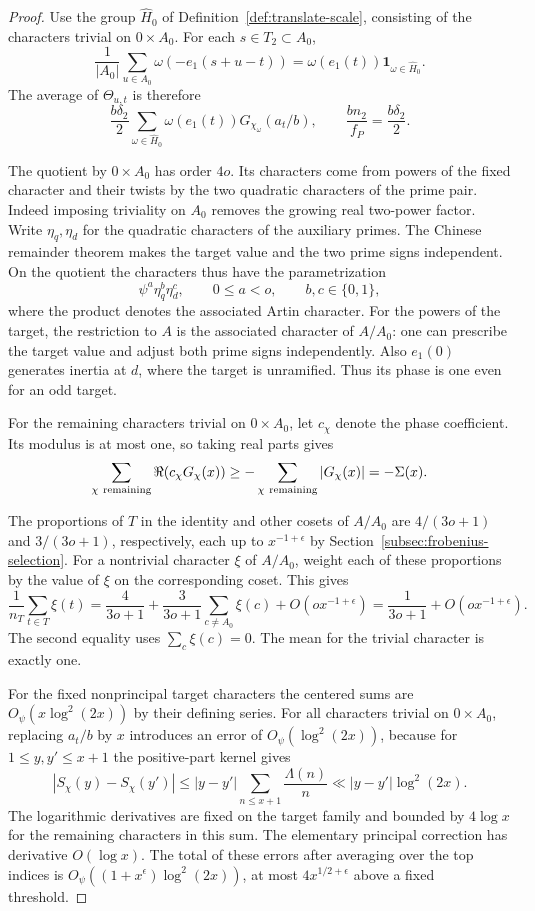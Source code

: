 \begin{proof}
Use the group \(\widehat H_0\) of Definition~\ref{def:translate-scale}, consisting of the characters trivial on
\(0\times A_0\). For each \(s\in T_2\subset A_0\),
\[
 \frac1{|A_0|}\sum_{u\in A_0}\omega(-e_1(s+u-t))
   =\omega(e_1(t))\mathbf 1_{\omega\in\widehat H_0}.
\]
The average of \(\Theta_{u,t}\) is therefore
\[
 \frac{b\delta_2}{2}
 \sum_{\omega\in\widehat H_0}
      \omega(e_1(t))G_{\chi_\omega}(a_t/b),
 \qquad \frac{bn_2}{f_P}=\frac{b\delta_2}{2}.
\] 

The quotient by \(0\times A_0\) has order
\(4o\). Its characters come from powers of the fixed character
and their twists by the two quadratic characters of the prime
pair. Indeed imposing triviality on \(A_0\) removes the growing
real two-power factor. Write \(\eta_q,\eta_d\) for the quadratic characters of the auxiliary primes. The Chinese remainder theorem makes the target value and the two prime signs independent. On the quotient the characters thus have the parametrization
\[
 \psi^a\eta_q^b\eta_d^c,
 \qquad 0\le a<o,\qquad b,c\in\{0,1\},
\]
where the product denotes the associated Artin character. For the powers of the target,
the restriction to \(A\) is the associated character of \(A/A_0\):
one can prescribe the target value and adjust both prime signs
independently. Also \(e_1(0)\) generates inertia at \(d\), where
the target is unramified. Thus its phase is one even for an odd
target. 

For the remaining characters trivial on \(0\times A_0\), let \(c_\chi\) denote the phase coefficient. Its modulus is at most one, so taking real parts gives
\[
 \sum_{\chi\ {\rm remaining}}\Re\!\left(c_\chi G_\chi(x)\right)\ge-\sum_{\chi\ {\rm remaining}}|G_\chi(x)|=-\Sigma(x).
\]

The proportions of \(T\) in the identity and other cosets of
\(A/A_0\) are \(4/(3o+1)\) and \(3/(3o+1)\), respectively,
each up to \(x^{-1+\epsilon}\) by Section~\ref{subsec:frobenius-selection}.
For a nontrivial character \(\xi\) of \(A/A_0\), weight each of these
proportions by the value of \(\xi\) on the corresponding coset. This gives
\[
 \frac1{n_T}\sum_{t\in T}\xi(t)
  =\frac4{3o+1}+\frac3{3o+1}\sum_{c\ne A_0}\xi(c)
     +O(o x^{-1+\epsilon})
  =\frac1{3o+1}+O(o x^{-1+\epsilon}).
\]
The second equality uses \(\sum_c\xi(c)=0\). The mean for the
trivial character is exactly one.

For the fixed nonprincipal target characters the centered sums
are \(O_\psi(x\log^2(2x))\) by their defining series.
For all characters trivial on \(0\times A_0\), replacing \(a_t/b\) by \(x\) introduces an error of
\(O_\psi(\log^2(2x))\), because for \(1\le y,y'\le x+1\) the positive-part kernel gives
\[
 |S_\chi(y)-S_\chi(y')|
 \le |y-y'|\sum_{n\le x+1}\frac{\Lambda(n)}n
 \ll |y-y'|\log^2(2x).
\]
The logarithmic derivatives are fixed on the target family and
bounded by \(4\log x\) for the remaining characters in this sum. The elementary
principal correction has derivative \(O(\log x)\). The total of
these errors after averaging over the top indices is
\(O_\psi((1+x^\epsilon)\log^2(2x))\), at most
\(4x^{1/2+\epsilon}\) above a fixed threshold.


\end{proof}
